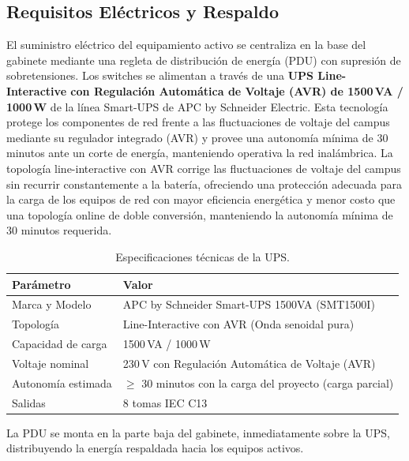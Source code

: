 \subsection{Requisitos Eléctricos y Respaldo}
El suministro eléctrico del equipamiento activo se centraliza en la base del gabinete mediante una regleta de distribución de energía (PDU) con supresión de sobretensiones.
Los switches se alimentan a través de una \textbf{UPS Line-Interactive con Regulación Automática de Voltaje (AVR) de 1500\,VA / 1000\,W} de la línea Smart-UPS de APC by Schneider Electric.
Esta tecnología protege los componentes de red frente a las fluctuaciones de voltaje del campus mediante su regulador integrado (AVR) y provee una autonomía mínima de 30 minutos ante un corte de energía, manteniendo operativa la red inalámbrica.
La topología line-interactive con AVR corrige las fluctuaciones de voltaje del campus sin recurrir constantemente a la batería, ofreciendo una protección adecuada para la carga de los equipos de red con mayor eficiencia energética y menor costo que una topología online de doble conversión, manteniendo la autonomía mínima de 30 minutos requerida.

\begin{table}[H]
\centering
\caption{Especificaciones técnicas de la UPS.}
\label{tab:spec_ups}
\begin{tabular}{lp{9cm}}
\hline
\textbf{Parámetro} & \textbf{Valor} \\
\hline
Marca y Modelo & APC by Schneider Smart-UPS 1500VA (SMT1500I) \\
Topología & Line-Interactive con AVR (Onda senoidal pura) \\
Capacidad de carga & 1500\,VA / 1000\,W \\
Voltaje nominal & 230\,V con Regulación Automática de Voltaje (AVR) \\
Autonomía estimada & $\ge$ 30 minutos con la carga del proyecto (carga parcial) \\
Salidas & 8 tomas IEC C13 \\
\hline
\end{tabular}
\end{table}

La PDU se monta en la parte baja del gabinete, inmediatamente sobre la UPS, distribuyendo la energía respaldada hacia los equipos activos.

